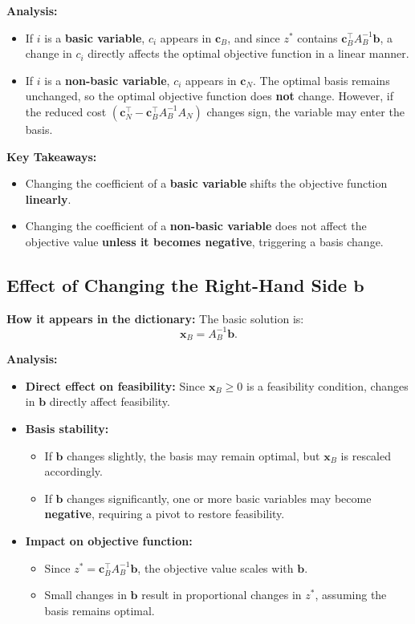 \textbf{Analysis:}
\begin{itemize}
    \item If \( i \) is a \textbf{basic variable}, \( c_i \) appears in \( \mathbf{c}_B \), and since \( z^* \) contains \( \mathbf{c}_B^\top A_B^{-1} \mathbf{b} \), a change in \( c_i \) directly affects the optimal objective function in a linear manner.
    \item If \( i \) is a \textbf{non-basic variable}, \( c_i \) appears in \( \mathbf{c}_N \). The optimal basis remains unchanged, so the optimal objective function does \textbf{not} change. However, if the reduced cost \( (\mathbf{c}_N^\top - \mathbf{c}_B^\top A_B^{-1} A_N) \) changes sign, the variable may enter the basis.
\end{itemize}

\textbf{Key Takeaways:}
\begin{itemize}
    \item Changing the coefficient of a \textbf{basic variable} shifts the objective function \textbf{linearly}.
    \item Changing the coefficient of a \textbf{non-basic variable} does not affect the objective value \textbf{unless it becomes negative}, triggering a basis change.
\end{itemize}

\subsection{Effect of Changing the Right-Hand Side \( \mathbf{b} \)}

\textbf{How it appears in the dictionary:}  
The basic solution is:
\[
\mathbf{x}_B = A_B^{-1} \mathbf{b}.
\]

\textbf{Analysis:}
\begin{itemize}
    \item \textbf{Direct effect on feasibility:} Since \( \mathbf{x}_B \geq 0 \) is a feasibility condition, changes in \( \mathbf{b} \) directly affect feasibility.
    \item \textbf{Basis stability:}
    \begin{itemize}
        \item If \( \mathbf{b} \) changes slightly, the basis may remain optimal, but \( \mathbf{x}_B \) is rescaled accordingly.
        \item If \( \mathbf{b} \) changes significantly, one or more basic variables may become \textbf{negative}, requiring a pivot to restore feasibility.
    \end{itemize}
    \item \textbf{Impact on objective function:}
    \begin{itemize}
        \item Since \( z^* = \mathbf{c}_B^\top A_B^{-1} \mathbf{b} \), the objective value scales with \( \mathbf{b} \).
        \item Small changes in \( \mathbf{b} \) result in proportional changes in \( z^* \), assuming the basis remains optimal.
    \end{itemize}
\end{itemize}

